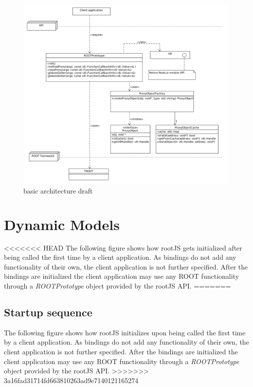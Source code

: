 \begin{figure}[htb]
	\centering
	\includegraphics[width=18cm]{./latex/resources/architecture.png}
	\caption{basic architecture draft}
\end{figure}
\pagebreak

\section{Dynamic Models}
<<<<<<< HEAD
The following figure shows how rootJS gets initialized after being called the first time by a client application. As bindings do not add any functionality of their own, the client application is not further specified. After the bindings are initialized the client application may use any ROOT functionality through a \textit{ROOTPrototype} object provided by the rootJS API.
=======
\subsection{Startup sequence}
The following figure shows how rootJS initializes upon being called the first time by a client application. As bindings do not add any functionality of their own, the client application is not further specified. After the bindings are initialized the client application may use any ROOT functionality through a \textit{ROOTPrototype} object provided by the rootJS API.
>>>>>>> 3a16fad31714fd663810263ad9e7140121165274

